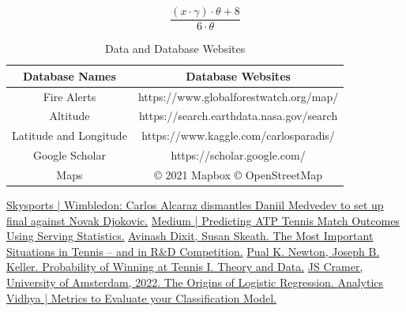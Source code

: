 \documentclass[12pt]{article}  %
\begin{document}
\[ \frac{{(x \cdot \gamma) \cdot \theta + 8}}{{6 \cdot \theta}} \tag{1}\]


\begin{table}[htbp]
	\begin{center}
		\caption{Data and Database Websites}
		\resizebox{\textwidth}{!}
		{\begin{tabular}{c c}
				\toprule[2pt]
				\multicolumn{1}{m{5cm}}{\centering \textbf{Database Names}}
				&\multicolumn{1}{m{10cm}}{\centering \textbf{Database Websites} }\\ %
				\midrule
				Fire Alerts& https://www.globalforestwatch.org/map/ \\
				Altitude & https://search.earthdata.nasa.gov/search \\
				Latitude and Longitude & https://www.kaggle.com/carlosparadis/\\ 
				Google Scholar & https://scholar.google.com/ \\
				Maps& \copyright{} 2021 Mapbox \copyright{} OpenStreetMap\\
				\bottomrule[2pt]
		\end{tabular}}
	\end{center}
\end{table}




\clearpage   
\begin{thebibliography}{99}
     \href{https://www.skysports.com/tennis/news/32498/12920986/wimbledon-carlos-alcaraz-dismantles-daniil-medvedev-to-set-up-final-against-novak-djokovic}{Skysports | Wimbledon: Carlos Alcaraz dismantles Daniil Medvedev to set up final against Novak Djokovic.}
	 \href{https://medium.com/swlh/cde03d99f410}{Medium | Predicting ATP Tennis Match Outcomes Using Serving Statistics.}
	 \href{https://www.princeton.edu/~dixitak/home/Tennis.pdf}{Avinash Dixit, Susan Skeath. The Most Important Situations in Tennis – and in R\&D Competition.}
	 \href{https://www.cis.upenn.edu/~bhusnur4/cit592\_fall2013/NeKe2005.pdf}{Pual K. Newton, Joseph B. Keller. Probability of Winning at Tennis I. Theory and Data.}
	 \href{https://papers.tinbergen.nl/02119.pdf}{JS Cramer, University of Amsterdam, 2022. The Origins of Logistic Regression. }
	 \href{https://www.analyticsvidhya.com/blog/2021/07/metrics-to-evaluate-your-classification-model-to-take-the-right-decisions/}{Analytics Vidhya | Metrics to Evaluate your Classification Model.}

\end{thebibliography}
\end{document}
